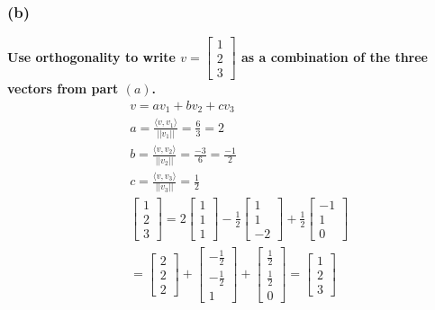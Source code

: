 \documentclass[10pt,letterpaper]{article}
\begin{document}
	\subsubsection*{(b)} \textbf{Use orthogonality to write $v = \begin{bmatrix}
		1 \\ 2 \\ 3
		\end{bmatrix}$ as a combination of the three vectors from part $(a)$. }
	\begin{align*}
	& v = av_1 + bv_2 + cv_3 \\ 
	& a = \frac{\langle v, v_1 \rangle}{||v_1||} = \frac{6}{3} = 2 \\
	& b = \frac{\langle v, v_2 \rangle}{||v_2||} = \frac{-3}{6} = \frac{-1}{2} \\
	& c = \frac{\langle v, v_3 \rangle}{||v_3||} = \frac{1}{2}\\ 
	& \begin{bmatrix}
	1 \\ 2 \\ 3
	\end{bmatrix} = 2 \begin{bmatrix}
	1 \\ 1 \\ 1
	\end{bmatrix} - \frac{1}{2} \begin{bmatrix}
	1 \\ 1 \\ -2
	\end{bmatrix} + \frac{1}{2} \begin{bmatrix}
	-1 \\ 1 \\ 0
	\end{bmatrix} \\
	& = \begin{bmatrix}
	2 \\ 2 \\ 2
	\end{bmatrix} + \begin{bmatrix}
	-\frac{1}{2} \\ - \frac{1}{2} \\ 1 
	\end{bmatrix} + \begin{bmatrix}
	\frac{1}{2} \\ \frac{1}{2} \\ 0 
	\end{bmatrix} \boxed{= \begin{bmatrix}
	1 \\ 2 \\ 3
	\end{bmatrix}}
	\end{align*}
\end{document}
